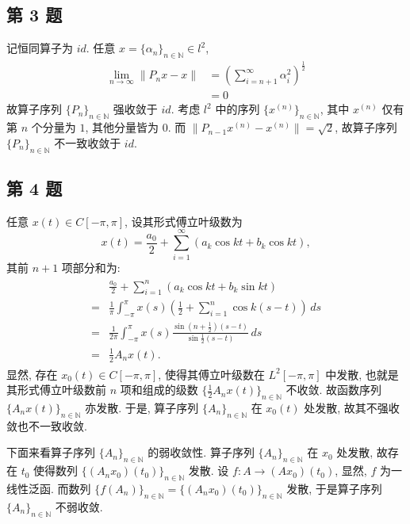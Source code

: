 \documentclass[../main.tex]{subfiles}
\begin{document}
\subsection{第 3 题}
记恒同算子为 $id$.
任意 $x = \{ \alpha_{n} \}_{n \in \mathbb{N}} \in l^2$,
\begin{align*}
    \lim_{n \to \infty} \| P_n x - x \| &= \left( \sum_{i = n + 1}^{\infty} \alpha_i^2 \right)^{\frac{1}{2}} \\
                    &= 0
\end{align*}
故算子序列 $\{ P_{n} \}_{n \in \mathbb{N}}$ 强收敛于 $id$.
考虑 $l^2$ 中的序列 $\{ x^{(n)} \}_{n \in \mathbb{N}}$,
其中 $x^{(n)}$ 仅有第 $n$ 个分量为 $1$, 其他分量皆为 $0$.
而 $\| P_{n - 1} x^{(n)} - x^{(n)} \| = \sqrt{2}$,
故算子序列 $\{ P_{n} \}_{n \in \mathbb{N}}$ 不一致收敛于 $id$.

\subsection{第 4 题}
任意 $x(t) \in C[-\pi, \pi]$, 设其形式傅立叶级数为
\[
    x(t) = \frac{a_0}{2} + \sum_{i = 1}^{\infty}(a_k \cos{kt} + b_k \cos{kt}),
\]
其前 $n + 1$ 项部分和为:
\begin{align}
    \begin{split} \label{eq:1}
         & \frac{a_0}{2} + \sum_{i = 1}^{n}(a_k \cos kt + b_k \sin kt) \\
        =& \frac{1}{\pi} \int_{-\pi}^{\pi} x(s)(\frac{1}{2} + \sum_{i = 1}^{n} \cos k(s - t)) \, ds \\
        =& \frac{1}{2 \pi} \int_{-\pi}^{\pi} x(s) \frac{\sin (n + \frac{1}{2})(s - t)}{\sin \frac{1}{2}(s - t)} \, ds \\
        =& \frac{1}{2} A_n x(t).
    \end{split}
\end{align}
显然, 存在 $x_0(t) \in C[-\pi, \pi]$,
使得其傅立叶级数在 $L^2 [-\pi, \pi]$ 中发散,
也就是其形式傅立叶级数前 $n$ 项和组成的级数 $\{ \frac{1}{2} A_n x(t) \}_{n \in \mathbb{N}}$ 不收敛.
故函数序列 $\{ A_n x(t) \}_{n \in \mathbb{N}}$ 亦发散.
于是, 算子序列 $\{ A_n \}_{n \in \mathbb{N}}$ 在 $x_0(t)$ 处发散,
故其不强收敛也不一致收敛.

下面来看算子序列 $\{ A_n \}_{n \in \mathbb{N}}$ 的弱收敛性.
算子序列 $\{ A_n \}_{n \in \mathbb{N}}$ 在 $x_0$ 处发散,
故存在 $t_0$ 使得数列 $\{ (A_n x_0)(t_0) \}_{n \in \mathbb{N}}$ 发散.
设 $f: A \to (A x_0)(t_0)$, 显然, $f$ 为一线性泛函.
而数列 $\{ f(A_n) \}_{n \in \mathbb{N}} = \{ (A_n x_0)(t_0) \}_{n \in \mathbb{N}}$ 发散,
于是算子序列 $\{ A_n \}_{n \in \mathbb{N}}$ 不弱收敛.
\end{document}
